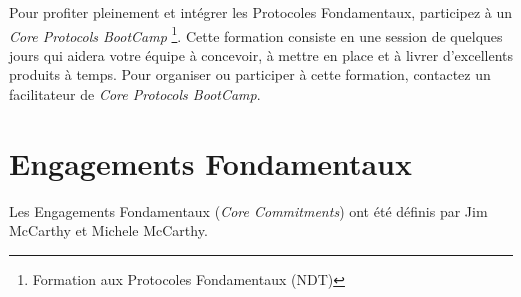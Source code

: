 \documentclass[paper=6in:9in,pagesize=pdftex,headinclude=on,footinclude=on,12pt]{scrbook}
\begin{document}
Pour profiter pleinement et intégrer les Protocoles Fondamentaux, participez à un \emph{Core Protocols BootCamp}
\footnote{Formation aux Protocoles Fondamentaux (NDT)}. Cette formation consiste en une session de quelques jours qui aidera
votre équipe à concevoir, à mettre en place et à livrer d'excellents produits à temps. Pour organiser ou participer à cette
formation, contactez un facilitateur de \emph{Core Protocols BootCamp}.

\chapter{Engagements Fondamentaux} \label{engagements}

Les Engagements Fondamentaux (\emph{Core Commitments}) ont été définis par Jim McCarthy et Michele McCarthy.
\end{document}
